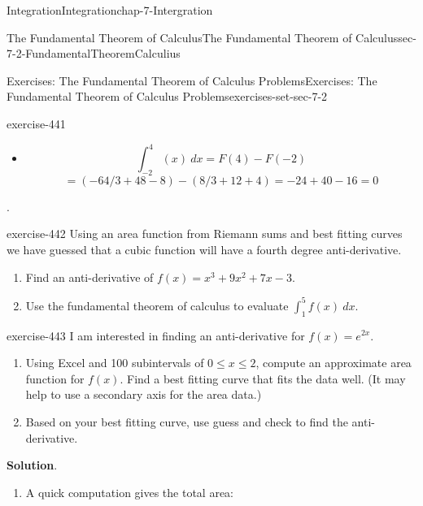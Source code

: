 \documentclass[oneside,10pt,]{book}
\numberwithin{equation}{section}
\begin{document}
\begin{chapterptx}{Integration}{}{Integration}{}{}{chap-7-Intergration}
\begin{sectionptx}{The Fundamental Theorem of Calculus}{}{The Fundamental Theorem of Calculus}{}{}{sec-7-2-FundamentalTheoremCalculius}
\begin{exercises-subsection-numberless}{Exercises: The Fundamental Theorem of Calculus Problems}{}{Exercises: The Fundamental Theorem of Calculus Problems}{}{}{exercises-set-sec-7-2}
\begin{divisionexercise}{7}{}{}{exercise-441}
\begin{enumerate}[label=(\alph*)]
\begin{itemize}[label=\textbullet]
%
\item{}%
\begin{equation*}
\int_{-2}^4 (x)\ dx=F(4)-F(-2)
\end{equation*}
%
\begin{equation*}
=(-64/3+48-8)-(8/3+12+4)= -24+40-16=0
\end{equation*}
%
\end{itemize}
.%
\end{enumerate}
\end{divisionexercise}%
\begin{divisionexercise}{8}{}{}{exercise-442}%
\hypertarget{p-2694}{}%
Using an area function from Riemann sums and best fitting curves we have guessed that a cubic function will have a fourth degree anti-derivative.%
\leavevmode%
\begin{enumerate}[label=(\alph*)]
\item\hypertarget{li-742}{}\hypertarget{p-2695}{}%
Find an anti-derivative of \(f(x)=x^3+9x^2+7x-3\).%
\item\hypertarget{li-743}{}\hypertarget{p-2696}{}%
Use the fundamental theorem of calculus to evaluate \(\int_1^5 f(x)\ dx\).%
\end{enumerate}
\end{divisionexercise}%
\begin{divisionexercise}{9}{}{}{exercise-443}%
\hypertarget{p-2697}{}%
I am interested in finding an anti-derivative for \(f(x)=e^{2x}\).%
\leavevmode%
\begin{enumerate}[label=(\alph*)]
\item\hypertarget{li-744}{}\hypertarget{p-2698}{}%
Using Excel and 100 subintervals of \(0 \le  x \le  2\), compute an approximate area function for \(f(x)\).  Find a best fitting curve that fits the data well.  (It may help to use a secondary axis for the area data.)%
\item\hypertarget{li-745}{}\hypertarget{p-2699}{}%
Based on your best fitting curve, use guess and check to find the anti-derivative.%
\end{enumerate}
\par\smallskip%
\noindent\textbf{Solution}.\hypertarget{solution-224}{}\quad%
\leavevmode%
\begin{enumerate}[label=(\alph*)]
\item\hypertarget{li-746}{}\hypertarget{p-2700}{}%
A quick computation gives the total area:%
\begin{sidebyside}{1}{0}{0}{0}%
\begin{sbspanel}{1}%

\end{sbspanel}
\end{sidebyside}
\end{enumerate}
\end{divisionexercise}
\end{exercises-subsection-numberless}
\end{sectionptx}
\end{chapterptx}
\end{document}
